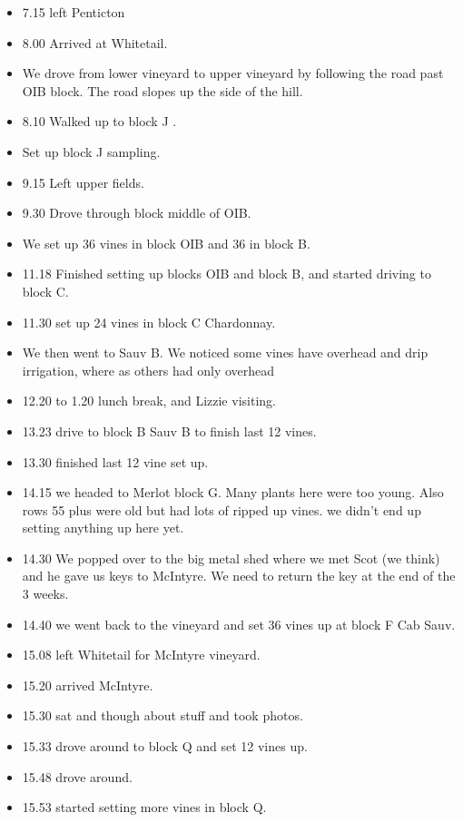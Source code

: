 \documentclass[11pt,letter]{article}
\newenvironment{smitemize}{
\begin{itemize}
  \setlength{\itemsep}{0pt}
  \setlength{\parskip}{0.8pt}
  \setlength{\parsep}{0pt}}
{\end{itemize}
}
\begin{document}
\begin{smitemize}
\subsubsection {schedule}

\item 7.15 left Penticton 
\item 8.00 Arrived at Whitetail. 
\item We drove from lower vineyard to upper vineyard by following the road past OIB block. The road slopes up the side of the hill. 
\item 8.10 Walked up to block J .
\item Set up block J sampling.
\item 9.15 Left upper fields. 
\item 9.30 Drove through block middle of OIB. 
\item We set up 36 vines in block OIB and 36 in block B.
\item 11.18 Finished setting up blocks OIB and block B, and started driving to block C. 
\item 11.30 set up 24 vines in block C Chardonnay. 
\item We then went to Sauv B. We noticed some vines have overhead and drip irrigation, where as others had only overhead 
\item 12.20 to 1.20 lunch break, and Lizzie visiting.
\item 13.23  drive to block B Sauv B to finish last 12 vines.
\item 13.30 finished last 12 vine set up. 
\item 14.15 we headed to Merlot block G. Many plants here were too young. Also rows 55 plus were old but had lots of ripped up vines. we didn't end up setting anything up here yet.
\item 14.30 We popped over to the big metal shed where we met Scot (we think) and he gave us keys to McIntyre. We need to return the key at the end of the 3 weeks. 
\item 14.40 we went back to the vineyard and set 36 vines up at block F Cab Sauv.
\item 15.08 left Whitetail for McIntyre vineyard.
\item 15.20 arrived McIntyre.
\item 15.30 sat and though about stuff and took photos.
\item 15.33 drove around to block Q and set 12 vines up.
\item 15.48 drove around.
\item 15.53 started setting more vines in block Q.

\end{smitemize}
\end{document}
